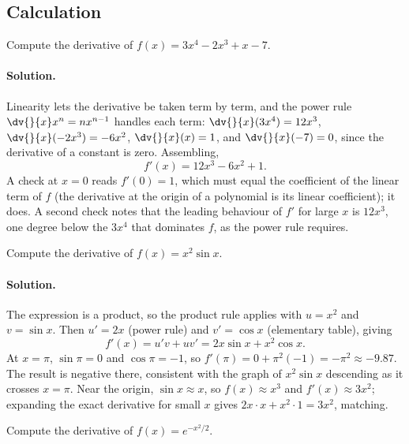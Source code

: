 \subsection*{Calculation}

\begin{exercise}
Compute the derivative of $f(x) = 3 x^{4} - 2 x^{3} + x - 7$.
\end{exercise}

\paragraph{Solution.}
Linearity lets the derivative be taken term by term, and the power
rule $\dv{}{x} x^{n} = n x^{n-1}$ handles each term:
$\dv{}{x}(3 x^{4}) = 12 x^{3}$, $\dv{}{x}(-2 x^{3}) = -6 x^{2}$,
$\dv{}{x}(x) = 1$, and $\dv{}{x}(-7) = 0$, since the derivative of
a constant is zero. Assembling,
\[
f'(x) = 12 x^{3} - 6 x^{2} + 1.
\]
A check at $x = 0$ reads $f'(0) = 1$, which must equal the
coefficient of the linear term of $f$ (the derivative at the origin
of a polynomial is its linear coefficient); it does. A second check
notes that the leading behaviour of $f'$ for large $x$ is $12 x^{3}$,
one degree below the $3 x^{4}$ that dominates $f$, as the power rule
requires.

\begin{exercise}
Compute the derivative of $f(x) = x^{2} \sin x$.
\end{exercise}

\paragraph{Solution.}
The expression is a product, so the product rule applies with
$u = x^{2}$ and $v = \sin x$. Then $u' = 2x$ (power rule) and
$v' = \cos x$ (elementary table), giving
\[
f'(x) = u' v + u v' = 2 x \sin x + x^{2} \cos x.
\]
At $x = \pi$, $\sin\pi = 0$ and $\cos\pi = -1$, so $f'(\pi) =
0 + \pi^{2}(-1) = -\pi^{2} \approx -9.87$. The result is negative
there, consistent with the graph of $x^{2}\sin x$ descending as it
crosses $x = \pi$. Near the origin, $\sin x \approx x$, so
$f(x) \approx x^{3}$ and $f'(x) \approx 3 x^{2}$; expanding the
exact derivative for small $x$ gives $2x \cdot x + x^{2} \cdot 1 =
3 x^{2}$, matching.

\begin{exercise}
Compute the derivative of $f(x) = e^{-x^{2}/2}$.
\end{exercise}

